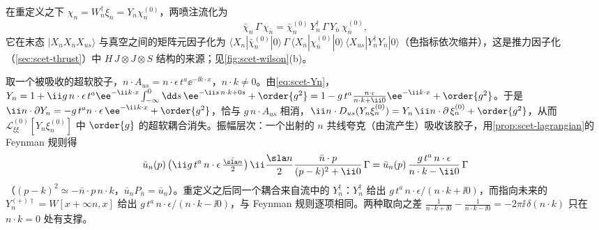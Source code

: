 在重定义之下 $\chi_n=W_n^\dagger\xi_n=Y_n\chi^{(0)}_n$，两喷注流化为
\begin{equation}\label{eq:scet-JY}
\bar\chi_n\,\Gamma\,\chi_{\bar n}=\bar\chi^{(0)}_n\,Y_n^\dagger\,\Gamma\,Y_{\bar n}\,\chi^{(0)}_{\bar n},
\end{equation}
它在末态 $|X_nX_{\bar n}X_{us}\rangle$ 与真空之间的矩阵元因子化为 $\langle X_n|\bar\chi^{(0)}_n|0\rangle\,\Gamma\,\langle X_{\bar n}|\chi^{(0)}_{\bar n}|0\rangle\,\langle X_{us}|Y_n^\dagger Y_{\bar n}|0\rangle$（色指标依次缩并），这是推力因子化（\cref{sec:scet-thrust}）中 $H\,J\otimes J\otimes S$ 结构的来源；见\cref{fig:scet-wilson}(b)。

\begin{example}\label{ex:scet-decoupling-tree}
取一个被吸收的超软胶子，$n\cdot A_{us}=n\cdot\epsilon\,t^a\ee^{-\ii k\cdot x}$，$n\cdot k\neq0$。由\cref{eq:scet-Yn}，$Y_n=1+\ii g\,n\cdot\epsilon\,t^a\ee^{-\ii k\cdot x}\int_{-\infty}^0\dd s\,\ee^{-\ii s\,n\cdot k+0s}+\order{g^2}=1-g\,t^a\frac{n\cdot\epsilon}{n\cdot k+\ii0}\ee^{-\ii k\cdot x}+\order{g^2}$。于是 $\ii n\cdot\partial Y_n=-g\,t^a n\cdot\epsilon\,\ee^{-\ii k\cdot x}+\order{g^2}$，恰与 $g\,n\cdot A_{us}$ 相消，$\ii n\cdot D_{us}(Y_n\xi^{(0)}_n)=Y_n\,\ii n\cdot\partial\,\xi^{(0)}_n+\order{g^2}$，从而 $\mathcal L^{(0)}_{\xi\xi}[Y_n\xi^{(0)}_n]$ 中 $\order{g}$ 的超软耦合消失。振幅层次：一个出射的 $n$ 共线夸克（由流产生）吸收该胶子，用\cref{prop:scet-lagrangian}的 Feynman 规则得
\[
\bar u_n(p)\,\big(\ii g\,t^a\,n\cdot\epsilon\,\tfrac{\bar{\sla n}}{2}\big)\,\ii\frac{\sla n}{2}\frac{\bar n\cdot p}{(p-k)^2+\ii0}\,\Gamma=\bar u_n(p)\,\frac{g\,t^a\,n\cdot\epsilon}{n\cdot k-\ii0}\,\Gamma
\]
（$(p-k)^2\simeq-\bar n\cdot p\,n\cdot k$，$\bar u_nP_{\bar n}=\bar u_n$）。重定义之后同一个耦合来自流中的 $Y_n^\dagger$：$Y_n^\dagger$ 给出 $g\,t^a\,n\cdot\epsilon/(n\cdot k+\ii0)$，而指向未来的 $Y_n^{(+)\dagger}=W[x+\infty n,x]$ 给出 $g\,t^a\,n\cdot\epsilon/(n\cdot k-\ii0)$，与 Feynman 规则逐项相同。两种取向之差 $\frac1{n\cdot k+\ii0}-\frac{1}{n\cdot k-\ii0}=-2\pi\ii\,\delta(n\cdot k)$ 只在 $n\cdot k=0$ 处有支撑。%
\end{example}

